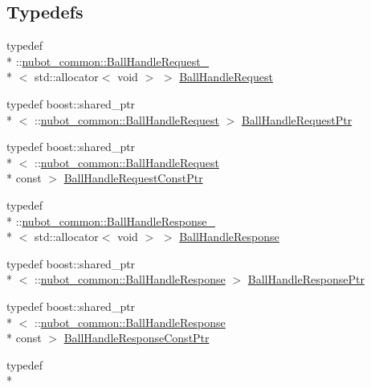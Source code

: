 \subsection*{Typedefs}
\begin{DoxyCompactItemize}
\item 
typedef \\*
\-::\hyperlink{structnubot__common_1_1BallHandleRequest__}{nubot\-\_\-common\-::\-Ball\-Handle\-Request\-\_\-}\\*
$<$ std\-::allocator$<$ void $>$ $>$ \hyperlink{namespacenubot__common_a100386a9c64318b13fb31e4548774326}{Ball\-Handle\-Request}
\item 
typedef boost\-::shared\-\_\-ptr\\*
$<$ \-::\hyperlink{namespacenubot__common_a100386a9c64318b13fb31e4548774326}{nubot\-\_\-common\-::\-Ball\-Handle\-Request} $>$ \hyperlink{namespacenubot__common_aed1d54f270f295a530870904737db641}{Ball\-Handle\-Request\-Ptr}
\item 
typedef boost\-::shared\-\_\-ptr\\*
$<$ \-::\hyperlink{namespacenubot__common_a100386a9c64318b13fb31e4548774326}{nubot\-\_\-common\-::\-Ball\-Handle\-Request} \\*
const  $>$ \hyperlink{namespacenubot__common_aef0f25206844e216fbe0463d8e65462a}{Ball\-Handle\-Request\-Const\-Ptr}
\item 
typedef \\*
\-::\hyperlink{structnubot__common_1_1BallHandleResponse__}{nubot\-\_\-common\-::\-Ball\-Handle\-Response\-\_\-}\\*
$<$ std\-::allocator$<$ void $>$ $>$ \hyperlink{namespacenubot__common_a8444206679493f649058adca72f0e538}{Ball\-Handle\-Response}
\item 
typedef boost\-::shared\-\_\-ptr\\*
$<$ \-::\hyperlink{namespacenubot__common_a8444206679493f649058adca72f0e538}{nubot\-\_\-common\-::\-Ball\-Handle\-Response} $>$ \hyperlink{namespacenubot__common_a30bbd1713324de81fe43e4556f37f0c3}{Ball\-Handle\-Response\-Ptr}
\item 
typedef boost\-::shared\-\_\-ptr\\*
$<$ \-::\hyperlink{namespacenubot__common_a8444206679493f649058adca72f0e538}{nubot\-\_\-common\-::\-Ball\-Handle\-Response} \\*
const  $>$ \hyperlink{namespacenubot__common_aef730bd6ed9b3d568e394cef1eff8a7c}{Ball\-Handle\-Response\-Const\-Ptr}
\item 
typedef \\*

\end{DoxyCompactItemize}

